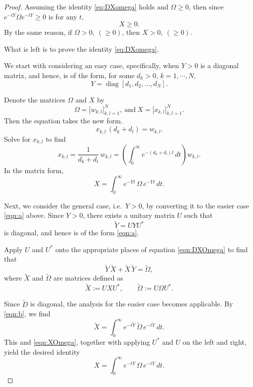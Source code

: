 \documentclass[10pt,a4paper]{amsart}
\begin{document}
\begin{proof}
Assuming the identity \eqref{eq:DXomega} holds and $\Omega\geq 0$, then since $e^{-tY} \Omega e^{-tY}\geq 0$ is for any $t$,
\[ X \geq 0. \]
By the same reason, if $\Omega > 0,\ (\geq 0)$, then $X > 0,\ (\geq 0)$.


What is left is to prove the identity \eqref{eq:DXomega}.

We start with considering an easy case, specifically, when $Y>0$ is a diagonal matrix, and hence, is of the form, for some $d_k>0$, $k=1,\cdots, N$,
\begin{equation}
  Y=\operatorname{diag}[d_1,d_2,\dots,d_N].
  \label{eqn:a}
\end{equation}

Denote the matrices $\Omega$ and $X$ by
\[
  \Omega=\bigl[w_{k,l}\bigr]_{k,l=1}^N,\ \text{and}\ 
  X=\bigl[x_{k,l}\bigr]_{k,l=1}^N.
\]
Then the equation takes the new form.
\[
  x_{k,l}\,(d_k+d_l)=w_{k,l}.
\]
Solve for $x_{k,l}$ to find
\[
  x_{k,l}
  =\frac{1}{d_k+d_l}\,w_{k,l}
  =\left(\int_0^\infty e^{-(d_k+d_l)t}\,dt\right) w_{k,l}.
\]
In the matrix form,
\begin{equation}\label{eqn:b}
  X=\int_0^\infty e^{-Yt}\,\Omega\,e^{-Yt}\,dt.
\end{equation}



Next, we consider the general case, i.e.\ $Y>0$, by converting it to the easier case \eqref{eqn:a} above.
Since $Y>0$, there exists a unitary matrix $U$ such that
\[
  \widetilde Y = UYU^*
\]
is diagonal, and hence is of the form \eqref{eqn:a}.

Apply $U$ and $U^*$ onto the appropriate places of equation \eqref{eqn:DXOmega} to find that
\[
  \widetilde Y\,\widetilde X+\widetilde X\,\widetilde Y=\widetilde\Omega,
\]
where $\widetilde X$ and $\widetilde\Omega$ are matrices defined as
\begin{equation}\label{eqn:XOmega}
  \widetilde X := UXU^*,
  \qquad
  \widetilde\Omega := U\Omega U^*.
\end{equation}

Since $\widetilde{D}$ is diagonal, the analysis for the easier case becomes applicable. By \eqref{eqn:b}, we find
\[
  \widetilde X = \int_0^\infty e^{-t\widetilde Y}\,\widetilde\Omega\,e^{-t\widetilde Y}\,dt.
\]
This and \eqref{eqn:XOmega}, together with applying $U^*$ and $U$ on the left and right, yield the desired identity
\[
  X = \int_0^\infty e^{-tY}\,\Omega\,e^{-tY}\,dt.
\]
\end{proof}
\end{document}

